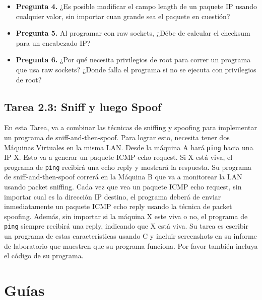\begin{itemize}
\item \textbf{Pregunta 4.}
¿Es posible modificar el campo length de un paquete IP usando cualquier valor, sin importar cuan grande sea el paquete en cuestión? 


\item \textbf{Pregunta 5.} 
Al programar con raw sockets, ¿Débe de calcular el checksum para un encabezado IP?

\item \textbf{Pregunta 6.} 
¿Por qué necesita privilegios de root para correr un programa que usa raw sockets? ¿Donde falla el programa si no se ejecuta con privilegios de root?

\end{itemize}
 





\subsection{Tarea 2.3: Sniff y luego Spoof}

En esta Tarea, va a combinar las técnicas de sniffing y spoofing para implementar un programa de sniff-and-then-spoof.
Para lograr esto, necesita tener dos Máquinas Virtuales en la misma LAN. Desde la máquina A hará {\tt ping} hacia una IP X. Esto va a generar un paquete  ICMP echo 
request. Si X está viva, el programa de {\tt ping} recibirá una echo reply y mostrará la respuesta. Su programa de sniff-and-then-spoof correrá en la Máquina B que va a monitorear la LAN usando packet sniffing. Cada vez que vea un paquete ICMP echo request, sin importar cual es la dirección IP destino, el programa deberá de enviar inmediatamente un paquete ICMP echo reply usando la técnica de packet spoofing. Además, sin importar si la máquina X este viva o no, el programa de {\tt ping} siempre recibirá una reply, indicando que X está viva. Su tarea es escribir un programa de estas características usando C y incluir screenshots en su informe de laboratorio que muestren que su programa funciona. Por favor también incluya el código de su programa.



\section{Guías} 



